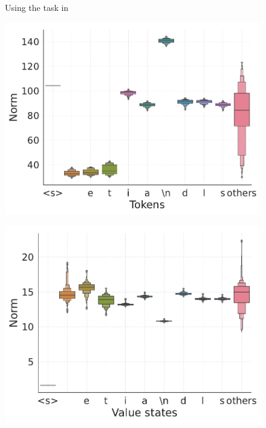 \begin{figure}
\begin{minipage}{0.45\textwidth}
  \end{minipage}
  \vspace{-1em}
  \caption{\small Using the task in \citet{bietti2024birth}}
  \label{figure:appendix-pretraining-biette-findings-1}
  \vspace{-1em}
\end{figure}

\begin{figure}
      \centering
  \begin{minipage}{0.45\textwidth}
      \centering
      \label{fig:appendix-biette-massive}
      \vspace{-.2em}
      \includegraphics[width=\linewidth]{Figures/figures_pretraining/Biette/Biette_L3_massive.pdf}
  \end{minipage}
  \hspace{-1em}
    \begin{minipage}{0.45\textwidth}
      \centering
      \label{fig:appendix-biette-minor}
      \vspace{-.2em}
      \includegraphics[width=\linewidth]{Figures/figures_pretraining/Biette/Biette_L3_minor.pdf}

\end{minipage}
\end{figure}
